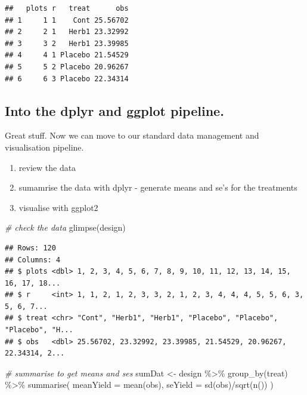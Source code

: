 \documentclass[
]{book}
\newenvironment{Shaded}{\begin{snugshade}}{\end{snugshade}}
\newcommand{\AttributeTok}[1]{\textcolor[rgb]{0.77,0.63,0.00}{#1}}
\newcommand{\CommentTok}[1]{\textcolor[rgb]{0.56,0.35,0.01}{\textit{#1}}}
\newcommand{\FunctionTok}[1]{\textcolor[rgb]{0.00,0.00,0.00}{#1}}
\newcommand{\NormalTok}[1]{#1}
\newcommand{\OtherTok}[1]{\textcolor[rgb]{0.56,0.35,0.01}{#1}}
\newcommand{\SpecialCharTok}[1]{\textcolor[rgb]{0.00,0.00,0.00}{#1}}
\providecommand{\tightlist}{%
  \setlength{\itemsep}{0pt}\setlength{\parskip}{0pt}}
\begin{document}
\begin{verbatim}
##   plots r   treat      obs
## 1     1 1    Cont 25.56702
## 2     2 1   Herb1 23.32992
## 3     3 2   Herb1 23.39985
## 4     4 1 Placebo 21.54529
## 5     5 2 Placebo 20.96267
## 6     6 3 Placebo 22.34314
\end{verbatim}

\hypertarget{into-the-dplyr-and-ggplot-pipeline.}{%
\subsection{Into the dplyr and ggplot pipeline.}\label{into-the-dplyr-and-ggplot-pipeline.}}

Great stuff. Now we can move to our standard data management and visualisation pipeline.

\begin{enumerate}
\def\labelenumi{\arabic{enumi}.}
\tightlist
\item
  review the data
\item
  sumamrise the data with dplyr - generate means and se's for the treatments
\item
  visualise with ggplot2
\end{enumerate}

\begin{Shaded}
\begin{Highlighting}[]
\CommentTok{\# check the data}
\FunctionTok{glimpse}\NormalTok{(design)}
\end{Highlighting}
\end{Shaded}

\begin{verbatim}
## Rows: 120
## Columns: 4
## $ plots <dbl> 1, 2, 3, 4, 5, 6, 7, 8, 9, 10, 11, 12, 13, 14, 15, 16, 17, 18...
## $ r     <int> 1, 1, 2, 1, 2, 3, 3, 2, 1, 2, 3, 4, 4, 4, 5, 5, 6, 3, 5, 6, 7...
## $ treat <chr> "Cont", "Herb1", "Herb1", "Placebo", "Placebo", "Placebo", "H...
## $ obs   <dbl> 25.56702, 23.32992, 23.39985, 21.54529, 20.96267, 22.34314, 2...
\end{verbatim}

\begin{Shaded}
\begin{Highlighting}[]
\CommentTok{\# summarise to get means and ses}
\NormalTok{sumDat }\OtherTok{\textless{}{-}}\NormalTok{ design }\SpecialCharTok{\%\textgreater{}\%} 
  \FunctionTok{group\_by}\NormalTok{(treat) }\SpecialCharTok{\%\textgreater{}\%} 
  \FunctionTok{summarise}\NormalTok{(}
    \AttributeTok{meanYield =} \FunctionTok{mean}\NormalTok{(obs),}
    \AttributeTok{seYield =} \FunctionTok{sd}\NormalTok{(obs)}\SpecialCharTok{/}\FunctionTok{sqrt}\NormalTok{(}\FunctionTok{n}\NormalTok{())}
\NormalTok{  )}
\end{Highlighting}
\end{Shaded}
\end{document}
